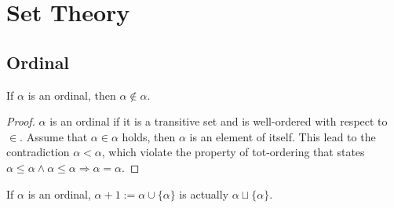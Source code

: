 \chapter{Set Theory}

\section{Ordinal}

\begin{proposition}
  If $\alpha$ is an ordinal, then $\alpha \notin \alpha$.
\end{proposition}

\begin{proof}
  $\alpha$ is an ordinal if it is a transitive set and is well-ordered with respect to $\in$. Assume that $\alpha \in \alpha$ holds, then $\alpha$ is an element of itself. This lead to the contradiction $\alpha < \alpha$, which violate the property of tot-ordering that states $\alpha \leq \alpha \wedge \alpha \leq \alpha \Rightarrow \alpha = \alpha$.
\end{proof}







\begin{corollary}
  If $\alpha$ is an ordinal, $\alpha + 1 := \alpha \cup \{ \alpha \}$ is actually $\alpha \sqcup \{ \alpha \}$.
\end{corollary}






